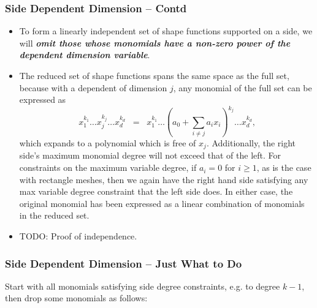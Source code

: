 \documentclass[compress]{beamer}
\begin{document}
\begin{frame}
  \frametitle{Side Dependent Dimension -- Contd}
  \begin{itemize}[<+->]
    \item To form a linearly independent set of shape functions supported on a side, we will \emph{\textbf{omit those whose 
      monomials have a non-zero power of the dependent dimension variable}}.
    \item The reduced set of shape functions spans the same space as the full set, because with a dependent of dimension $j$,
      any monomial of the full set can be expressed as
       $$x_1^{k_1} \dots x_j^{k_j} \dots x_d^{k_d}
           \;\; = \;\; x_1^{k_1} \dots (a_0 + \sum_{i \ne j} a_i x_{i})^{k_j} \dots x_d^{k_d}\text{,}$$
      which expands to a polynomial which is free of $x_j$. Additionally, the right side's maximum monomial degree will not exceed
      that of the left.  For constraints on the maximum variable degree, if $a_i = 0$ for $i \ge 1$,
      as is the case with rectangle meshes, then we again have the right hand side satisfying any max variable degree constraint
      that the left side does. In either case, the original monomial has been expressed as a linear combination of monomials in the reduced set.
    \item TODO: Proof of independence.
  \end{itemize}
\end{frame}


\begin{frame}
  \frametitle{Side Dependent Dimension -- Just What to Do}
  \pause
  Start with all monomials satisfying side degree constraints, e.g. to degree $k-1$, then drop some monomials as follows:
  \pause
  \pause
\end{frame}
\end{document}
